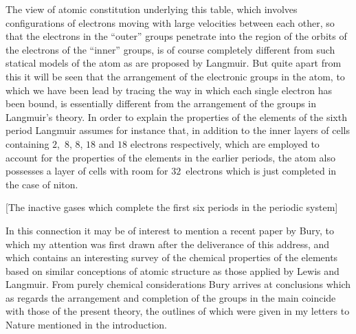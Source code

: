 The view of atomic constitution underlying this table, which
involves configurations of electrons moving with large velocities
between each other, so that the electrons in the ``outer'' groups
penetrate into the region of the orbits of the electrons of the ``inner''
groups, is of course completely different from such statical models
of the atom as are proposed by Langmuir. But quite apart from this
it will be seen that the arrangement of the electronic groups in
the atom, to which we have been lead by tracing the way in which
each single electron has been bound, is essentially different from
the arrangement of the groups in Langmuir's theory. In order to
explain the properties of the elements of the sixth period Langmuir
assumes for instance that, in addition to the inner layers of cells
containing $2$,~$8$, $8$, $18$ and $18$ electrons respectively, which are
employed to account for the properties of the elements in the
earlier periods, the atom also possesses a layer of cells with room
for $32$~electrons which is just completed in the case of niton.

[The inactive gases which complete the first six periods in the periodic system]

In this connection it may be of interest to mention a recent
paper by Bury, to which my attention was first drawn after the
deliverance of this address, and which contains an interesting
survey of the chemical properties of the elements based on similar
conceptions of atomic structure as those applied by Lewis and
Langmuir. From purely chemical considerations Bury arrives at
conclusions which as regards the arrangement and completion of
the groups in the main coincide with those of the present theory,
the outlines of which were given in my letters to Nature mentioned
in the introduction.

